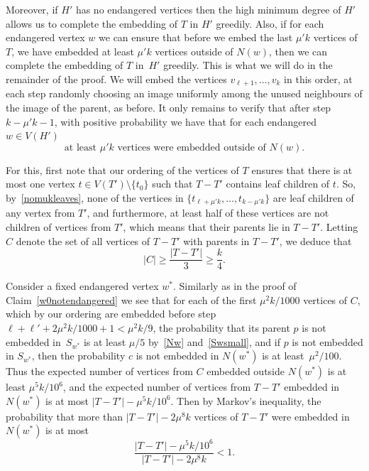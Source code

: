 \documentclass[12pt]{article}
\begin{document}
Moreover,
      if $H'$ has no endangered vertices then  the high minimum degree of $H'$ allows us to complete the embedding of $T$ in $H'$ greedily. %
      Also, if for each endangered vertex $w$ we can ensure that before we embed the last $\mu' k$ vertices of $T$, we have embedded at least $\mu' k$ vertices outside of $N(w)$, then we can complete the embedding of $T$ in~$H'$ greedily.
This is what we will do in the remainder of the proof. We will embed the  vertices $v_{\ell+1},\ldots,v_k$ in this order, at each step randomly choosing an image uniformly among the unused neighbours of the image of the parent, as before. It only remains to verify that after step $k-\mu' k-1$, with positive probability we have that for each endangered $w\in V(H')$
\begin{equation}\label{foreachwweembed}
\text{at least $\mu' k$ vertices were embedded outside of $N(w)$.}
\end{equation}

For this, first note that our ordering of the vertices of $T$  ensures that there is at most one vertex $t\in V(T')\setminus\{t_0\}$ such that $T-T'$ contains leaf children of $t$. %
So, by~\eqref{nomukleaves}, none of the vertices in $\{t_{\ell+\mu' k},\ldots, t_{k-\mu' k}\}$ are leaf children of any vertex from $T'$, and furthermore, at least half of these vertices  are not  children  of   vertices from $T'$, which means that their parents lie in $T-T'$. Letting $C$ denote  the set of all vertices of $T-T'$ with parents in $T-T'$, we deduce that $$|C|\ge \frac{|T-T'|}3 \ge \frac k4.$$

Consider a fixed endangered vertex ${w^*}$. 
 Similarly as in the proof of Claim~\ref{w0notendangered} we see that  for each of the first $\mu^2k/1000$ vertices of $C$, which by our ordering are embedded before step $\ell+\ell'+2\mu^2k/1000+1<\mu^2k/9$, the probability that its parent $p$ is not embedded
    in~$S_{w^*}$ is at least $\mu/5$ by~\eqref{Nw} and~\eqref{Swsmall}, and if $p$ is not embedded
    in $S_{w^*}$, then the probability $c$ is not embedded in $N({w^*})$ is at least~$\mu^2/100$. 
     Thus the expected number of vertices from $C$ embedded outside $N({w^*})$ is at least $\mu^5k/10^6$, and the expected number of vertices from $T-T'$ embedded  in $N({w^*})$ is at most $|T-T'|-\mu^5k/10^6$. 
     Then 
     by Markov's inequality, the probability that more than $|T-T'| - 2\mu^8k$ vertices of $T-T'$ were embedded in  $N({w^*})$ is at most 
$$\frac{|T-T'|-\mu^5k/10^6}{|T-T'| - 2\mu^8 k}<1.$$ %
\end{document}

